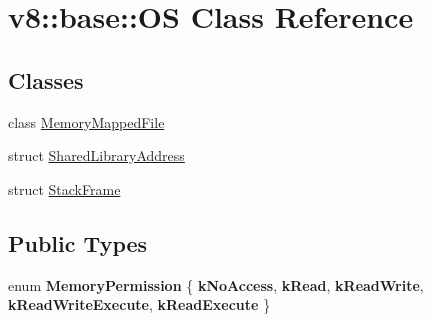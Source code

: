 \hypertarget{classv8_1_1base_1_1OS}{}\section{v8\+:\+:base\+:\+:OS Class Reference}
\label{classv8_1_1base_1_1OS}
\subsection*{Classes}
\begin{DoxyCompactItemize}
\item 
class \mbox{\hyperlink{classv8_1_1base_1_1OS_1_1MemoryMappedFile}{Memory\+Mapped\+File}}
\item 
struct \mbox{\hyperlink{structv8_1_1base_1_1OS_1_1SharedLibraryAddress}{Shared\+Library\+Address}}
\item 
struct \mbox{\hyperlink{structv8_1_1base_1_1OS_1_1StackFrame}{Stack\+Frame}}
\end{DoxyCompactItemize}
\subsection*{Public Types}
\begin{DoxyCompactItemize}
\item 
\mbox{\label{classv8_1_1base_1_1OS_a784ff62e67203e60451e5952454046e4}} 
enum {\bfseries Memory\+Permission} \{ \newline
{\bfseries k\+No\+Access}, 
{\bfseries k\+Read}, 
{\bfseries k\+Read\+Write}, 
{\bfseries k\+Read\+Write\+Execute}, 
\newline
{\bfseries k\+Read\+Execute}
 \}
\end{DoxyCompactItemize}
